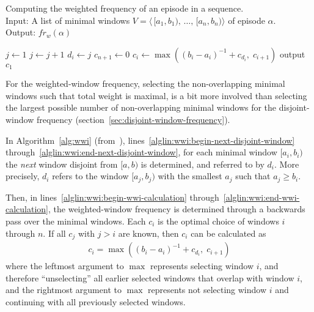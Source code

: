 \begin{algorithm}

\caption{Computing the weighted frequency of an episode in a sequence.\\
Input: A list of minimal windows $ V = \langle \, [a_1, b_1), \, \ldots, \, [a_n, b_n) \rangle $ of episode $ \alpha $.\\
Output: $ fr_w(\alpha) $
}

\begin{algorithmic}[1]

\State $ j \gets 1 $
\ForAll {$ [a_i, b_i) \in V $} \label{alglin:wwi:begin-next-disjoint-window}
        \State $ j \gets j + 1 $
    \EndWhile
    \State $ d_i \gets j $ \label{alglin:wwi:end-next-disjoint-window}
\EndFor
\State $ c_{n + 1} \gets 0 $ \label{alglin:wwi:begin-wwi-calculation}
    \State $ c_i \gets \max((b_i - a_i)^{-1} + c_{d_i}, \; c_{i+1}) $ \label{alglin:wwi:end-wwi-calculation}
\EndFor
\State output $ c_1 $

\end{algorithmic}

\label{alg:wwi}
\end{algorithm}

For the weighted-window frequency, selecting the non-overlapping minimal windows such that total weight is maximal, is a bit more involved than selecting the largest possible number of non-overlapping minimal windows for the disjoint-window frequency (section~\ref{sec:disjoint-window-frequency}).

In Algorithm~\ref{alg:wwi} (from~\cite{cule2014marbles}), lines~\ref{alglin:wwi:begin-next-disjoint-window} through~\ref{alglin:wwi:end-next-disjoint-window}, for each minimal window $ [a_i, b_i) $ the \emph{next} window disjoint from $ [a, b) $ is determined, and referred to by $ d_i $. More precisely, $ d_i $ refers to the window $ [a_j, b_j) $ with the smallest $ a_j $ such that $ a_j \geq b_i $.

Then, in lines~\ref{alglin:wwi:begin-wwi-calculation} through~\ref{alglin:wwi:end-wwi-calculation}, the weighted-window frequency is determined through a backwards pass over the minimal windows. Each $ c_i $ is the optimal choice of windows $ i $ through $ n $. If all $ c_j $ with $ j > i $ are known, then $ c_i $ can be calculated as
\begin{align*}
c_i = \max((b_i - a_i)^{-1} + c_{d_i}, \; c_{i+1})
\end{align*}
where the leftmost argument to $ \max $ represents selecting window $ i $, and therefore ``unselecting'' all earlier selected windows that overlap with window $ i $, and the rightmost argument to $ \max $ represents not selecting window $ i $ and continuing with all previously selected windows.

